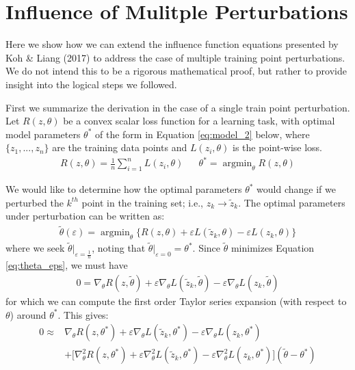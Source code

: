 \documentclass{article}
\DeclareMathOperator*{\argmin}{argmin}
\begin{document}
\pagebreak
\section{Influence of Mulitple Perturbations}
Here we show how we can extend the influence function equations presented by Koh \& Liang (2017) to address the case of multiple training point perturbations. We do not intend this to be a rigorous mathematical proof, but rather to provide insight into the logical steps we followed. 

First we summarize the derivation in the case of a single train point perturbation. Let  $R(z, \theta)$ be a convex scalar loss function for a learning task, with optimal model parameters $\theta^*$ of the form in Equation \ref{eq:model_2} below, where $\{z_1, ... , z_n\}$ are the training data points and $L(z_i, \theta)$ is the point-wise loss.
\begin{align}\label{eq:model_2}
R(z, \theta) = \frac{1}{n} \sum_{i=1}^n L(z_i, \theta) && \theta^* = \argmin_{\theta} R(z, \theta)
\end{align}

We would like to determine how the optimal parameters $\theta^*$ would change if we perturbed the $k^{th}$ point in the training set; i.e., $z_k \rightarrow \tilde{z}_k$. The optimal parameters under perturbation can be written as:
\begin{align}\label{eq:theta_eps}
\tilde{\theta}(\varepsilon) = \argmin_{\theta} \bigg\{ R(z, \theta) + \varepsilon L(\tilde{z}_k, \theta) - \varepsilon L(z_k, \theta) \bigg\}
\end{align}
where we seek $\tilde{\theta}\rvert_{\varepsilon=\frac{1}{n}}$, noting that $\tilde{\theta}\rvert_{\varepsilon=0} = \theta^*$. Since $\tilde{\theta}$ minimizes Equation \ref{eq:theta_eps}, we must have
\begin{align*}
0 = \nabla_{\theta} R(z, \tilde{\theta}) + \varepsilon \nabla_{\theta} L(\tilde{z}_k, \tilde{\theta}) - \varepsilon \nabla_{\theta} L(z_k, \tilde{\theta})
\end{align*}
for which we can compute the first order Taylor series expansion (with respect to $\theta$) around $\theta^*$. This gives:
\begin{align*}
0 \approx& \nabla_{\theta} R(z, \theta^*)+  \varepsilon \nabla_{\theta} L(\tilde{z}_k, \theta^*) -  \varepsilon \nabla_{\theta} L(z_k, \theta^*) \\
&+ \big[\nabla_{\theta}^2 R(z, \theta^*) + \varepsilon \nabla_{\theta}^2 L(\tilde{z}_k, \theta^*) - \varepsilon \nabla_{\theta}^2 L(z_k, \theta^*)\big](\tilde{\theta} - \theta^*)
\end{align*}
\end{document}
